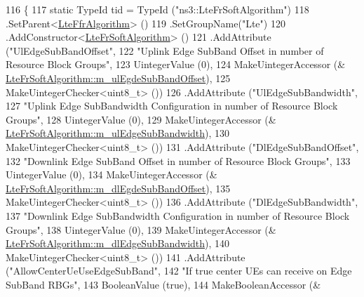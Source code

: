 \begin{DoxyCode}
116 \{
117   \textcolor{keyword}{static} TypeId tid = TypeId (\textcolor{stringliteral}{"ns3::LteFrSoftAlgorithm"})
118     .SetParent<\hyperlink{classns3_1_1LteFfrAlgorithm_a1cfb2b0c9339553d90bf3eee7b66b25f}{LteFfrAlgorithm}> ()
119     .SetGroupName(\textcolor{stringliteral}{"Lte"})
120     .AddConstructor<\hyperlink{classns3_1_1LteFrSoftAlgorithm_a9c20a6b77c68784dec889ccf01e21bb6}{LteFrSoftAlgorithm}> ()
121     .AddAttribute (\textcolor{stringliteral}{"UlEdgeSubBandOffset"},
122                    \textcolor{stringliteral}{"Uplink Edge SubBand Offset in number of Resource Block Groups"},
123                    UintegerValue (0),
124                    MakeUintegerAccessor (&
      \hyperlink{classns3_1_1LteFrSoftAlgorithm_a10b3660c54a8f9f05f05708509283f11}{LteFrSoftAlgorithm::m\_ulEgdeSubBandOffset}),
125                    MakeUintegerChecker<uint8\_t> ())
126     .AddAttribute (\textcolor{stringliteral}{"UlEdgeSubBandwidth"},
127                    \textcolor{stringliteral}{"Uplink Edge SubBandwidth Configuration in number of Resource Block Groups"},
128                    UintegerValue (0),
129                    MakeUintegerAccessor (&
      \hyperlink{classns3_1_1LteFrSoftAlgorithm_a32a47126b3423faab9941788f5ea78a3}{LteFrSoftAlgorithm::m\_ulEdgeSubBandwidth}),
130                    MakeUintegerChecker<uint8\_t> ())
131     .AddAttribute (\textcolor{stringliteral}{"DlEdgeSubBandOffset"},
132                    \textcolor{stringliteral}{"Downlink Edge SubBand Offset in number of Resource Block Groups"},
133                    UintegerValue (0),
134                    MakeUintegerAccessor (&
      \hyperlink{classns3_1_1LteFrSoftAlgorithm_aadc9197fbe96b51bc0299fe0e3529523}{LteFrSoftAlgorithm::m\_dlEgdeSubBandOffset}),
135                    MakeUintegerChecker<uint8\_t> ())
136     .AddAttribute (\textcolor{stringliteral}{"DlEdgeSubBandwidth"},
137                    \textcolor{stringliteral}{"Downlink Edge SubBandwidth Configuration in number of Resource Block Groups"},
138                    UintegerValue (0),
139                    MakeUintegerAccessor (&
      \hyperlink{classns3_1_1LteFrSoftAlgorithm_a0111325549d53fc66f51f1df6e88e90b}{LteFrSoftAlgorithm::m\_dlEdgeSubBandwidth}),
140                    MakeUintegerChecker<uint8\_t> ())
141     .AddAttribute (\textcolor{stringliteral}{"AllowCenterUeUseEdgeSubBand"},
142                    \textcolor{stringliteral}{"If true center UEs can receive on Edge SubBand RBGs"},
143                    BooleanValue (\textcolor{keyword}{true}),
144                    MakeBooleanAccessor (&

\end{DoxyCode}
